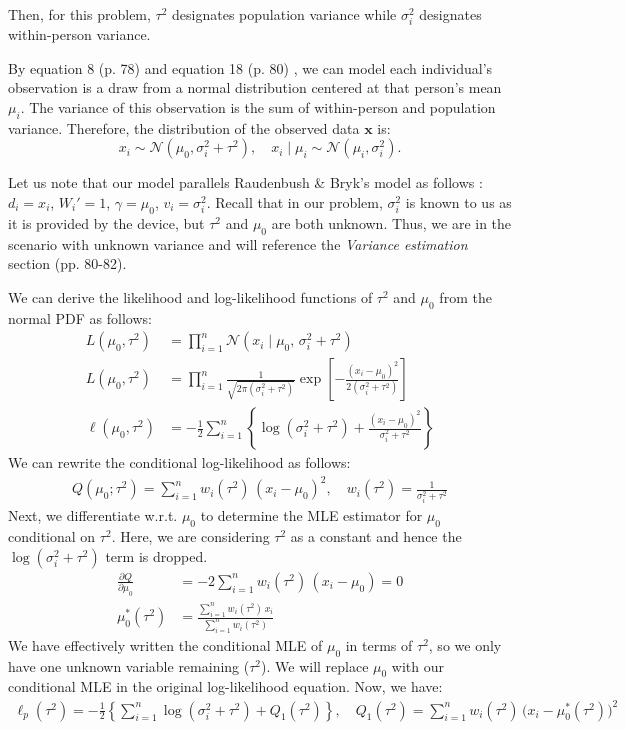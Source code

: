 \documentclass[letterpaper, 11pt]{extarticle}\usepackage[]{graphicx}\usepackage[]{xcolor}
\begin{document}
Then, for this problem, $\tau^2$ designates population variance while $\sigma_i^2$ designates within-person variance. 

By equation 8 (p. 78) and equation 18 (p. 80) \cite{doi:10.3102/10769986010002075}, we can model each individual's observation is a draw from a normal distribution centered at that person's mean $\mu_i$. The variance of this observation is the sum of within-person and population variance. Therefore, the distribution of the observed data $\textbf{x}$ is:
$$x_i \sim \mathcal{N}(\mu_0, \sigma_i^2+\tau^2), \quad x_i \mid \mu_i \sim \mathcal{N}(\mu_i, \sigma_i^2).$$

Let us note that our model parallels Raudenbush \& Bryk's model as follows \cite{doi:10.3102/10769986010002075}: $d_i = x_i$, $W_i' = 1$, $\gamma = \mu_0$, $v_i = \sigma_i^2$. Recall that in our problem, $\sigma_i^2$ is known to us as it is provided by the device, but $\tau^2$ and $\mu_0$ are both unknown. Thus, we are in the scenario with unknown variance and will reference the \textit{Variance estimation} section (pp. 80-82). 

We can derive the likelihood and log-likelihood functions of $\tau^2$ and $\mu_0$ from the normal PDF as follows:
\begin{align}
L(\mu_0, \tau^2)
&= \prod_{i=1}^{n}
  \mathcal{N}\!\left(x_i \mid \mu_0,\, \sigma_i^2 + \tau^2\right)\\
L(\mu_0, \tau^2)
&= \prod_{i=1}^{n}
  \frac{1}{\sqrt{2\pi(\sigma_i^2 + \tau^2)}}
  \exp\!\left[
    -\frac{(x_i - \mu_0)^2}{2(\sigma_i^2 + \tau^2)}
  \right]\\
  \ell(\mu_0, \tau^2)
&= -\frac{1}{2} \sum_{i=1}^{n}
  \left\{
    \log(\sigma_i^2 + \tau^2)
    + \frac{(x_i - \mu_0)^2}{\sigma_i^2 + \tau^2}
  \right\}
\end{align}
We can rewrite the conditional log-likelihood as follows:
\begin{align}
Q(\mu_0;\tau^2)=\sum_{i=1}^{n}w_i(\tau^2)\,(x_i-\mu_0)^2,
\quad w_i(\tau^2)=\frac{1}{\sigma_i^2+\tau^2}
\end{align}
Next, we differentiate w.r.t. $\mu_0$ to determine the MLE estimator for $\mu_0$ conditional on $\tau^2$. Here, we are considering $\tau^2$ as a constant and hence the $\log(\sigma_i^2 + \tau^2)$ term is dropped.
\begin{align}
    \frac{\partial Q}{\partial \mu_0}
&=-2\sum_{i=1}^{n}w_i(\tau^2)\,(x_i-\mu_0)=0\\
\mu_0^*(\tau^2)&=\frac{\sum_{i=1}^{n} w_i(\tau^2)\,x_i}{\sum_{i=1}^{n} w_i(\tau^2)}
\end{align}
We have effectively written the conditional MLE of $\mu_0$ in terms of $\tau^2$, so we only have one unknown variable remaining ($\tau^2$). We will replace $\mu_0$ with our conditional MLE in the original log-likelihood equation. Now, we have:
\begin{align}
    \ell_p(\tau^2)
= -\frac12\left\{
\sum_{i=1}^{n}\log(\sigma_i^2+\tau^2)
	+	Q_1(\tau^2)
\right\}, \quad Q_1(\tau^2)=\sum_{i=1}^{n} w_i(\tau^2)\,\bigl(x_i-\mu_0^*(\tau^2)\bigr)^2
\end{align} 
\end{document}
